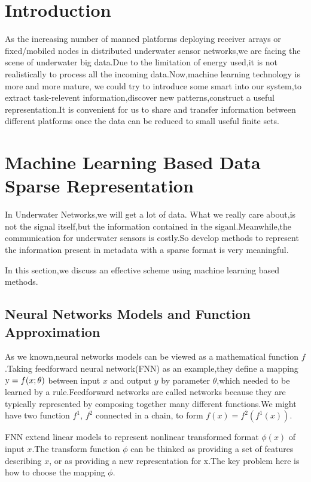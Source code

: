 \section{Introduction}
As the increasing number of manned platforms deploying receiver arrays or  fixed/mobiled nodes in distributed underwater sensor networks,we are facing the scene of underwater big data.Due to the limitation of energy used,it is not realistically to process all the incoming data\cite{Yang2015Issues}.Now,machine learning technology is more and more mature, we could try to introduce some smart into our system,to extract task-relevent information,discover new patterns,construct a useful representation.It is convenient for us to share and transfer information between different platforms once the data can be reduced to small useful finite sets.

\section{Machine Learning Based Data Sparse Representation}
In Underwater Networks,we will get a lot of data. What we really care about,is not the signal itself,but the information contained in the siganl.Meanwhile,the communication for underwater sensors is costly.So develop methods to represent the information present in metadata with a sparse format is very meaningful.

In this section,we discuss an effective scheme using machine learning based methods.

\subsection{Neural Networks Models and Function Approximation}
As we known,neural networks models can be viewed as a mathematical function $f$.Taking feedforward neural network(FNN) as an example,they define a mapping ${\rm{y}}=f(x;\theta )$ between input $x$ and output $y$ by parameter $\theta$,which needed to be learned by a rule.Feedforward networks are called networks because they are typically represented by composing together many different functions.We might have two function $f^{1}$, $f^{2}$ connected in a chain\cite{goodfellow2016deep}, to form
$f(x) = f^{2}(f^{1}(x))$.

FNN extend linear models to represent nonlinear transformed format $\phi(x)$ of input $x$.The transform function $\phi$ can be thinked as providing a set of features describing $x$, or as providing a new representation for x.The key problem here is how to choose the mapping $\phi$.

